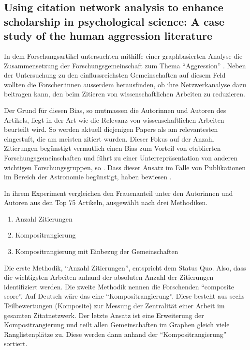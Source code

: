 \subsection{Using citation network analysis to enhance scholarship in psychological science: A case study of the human aggression literature}

In dem Forschungsartikel  untersuchten \citeauthor{citation-network} mithilfe einer graphbasierten Analyse
die Zusammensetzung der Forschungsgemeinschaft zum Thema \enquote{Aggression} \cite{citation-network}. Neben der Untersuchung zu den
einflussreichsten Gemeinschaften auf diesem Feld wollten die Forscher:innen ausserdem herausfinden, ob ihre Netzwerkanalyse dazu beitragen kann,
den  beim Zitieren von wissenschaftlichen Arbeiten zu reduzieren.

Der Grund für diesen Bias, so mutmassen die Autorinnen und Autoren des Artikels, liegt in der Art wie die Relevanz von wissenschaftlichen Arbeiten beurteilt wird.
So werden aktuell diejenigen Papers als am relevantesten eingestuft, die am meisten zitiert wurden. Dieser Fokus auf der Anzahl Zitierungen begünstigt
vermutlich einen Bias zum Vorteil von etablierten Forschungsgemeinschaften und führt zu einer Unterrepräsentation von anderen wichtigen Forschungsgruppen,
so \citeauthor{citation-network}. Dass dieser Ansatz im Falle von Publikationen im Bereich der Astronomie  begünstigt, haben
\citeauthor{citation-astronomy} bewiesen \cite{citation-astronomy}.

In ihrem Experiment vergleichen \citeauthor{citation-network} den Frauenanteil unter den Autorinnen und Autoren aus den Top 75 Artikeln, ausgewählt nach drei Methodiken.
\begin{enumerate}
    \item Anzahl Zitierungen
    \item Kompositrangierung
    \item Kompositrangierung mit Einbezug der Gemeinschaften
\end{enumerate}

Die erste Methodik, \enquote{Anzahl Zitierungen}, entspricht dem Status Quo. Also, dass die wichtigsten Arbeiten anhand der absoluten Anzahl der Zitierungen
identifiziert werden. Die zweite Methodik nennen die Forschenden \enquote{composite score}. Auf Deutsch wäre das eine \enquote{Kompositrangierung}.
Diese besteht aus sechs Teilbewertungen (Komposite) zur Messung der Zentralität einer Arbeit im gesamten Zitatnetzwerk.
Der letzte Ansatz ist eine Erweiterung der Kompositrangierung und teilt allen Gemeinschaften im Graphen gleich viele Ranglistenplätze zu. Diese werden dann anhand der
\enquote{Kompositrangierung} sortiert.

